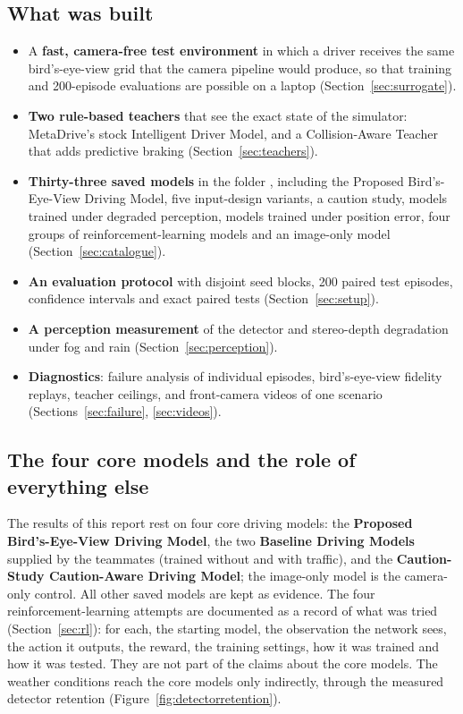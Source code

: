 \subsection{What was built}
\begin{itemize}
\item A \textbf{fast, camera-free test environment} in which a driver receives the same bird's-eye-view grid that the camera pipeline would produce, so that training and 200-episode evaluations are possible on a laptop (Section~\ref{sec:surrogate}).
\item \textbf{Two rule-based teachers} that see the exact state of the simulator: MetaDrive's stock Intelligent Driver Model, and a Collision-Aware Teacher that adds predictive braking (Section~\ref{sec:teachers}).
\item \textbf{Thirty-three saved models} in the folder , including the Proposed Bird's-Eye-View Driving Model, five input-design variants, a caution study, models trained under degraded perception, models trained under position error, four groups of reinforcement-learning models and an image-only model (Section~\ref{sec:catalogue}).
\item \textbf{An evaluation protocol} with disjoint seed blocks, 200 paired test episodes, confidence intervals and exact paired tests (Section~\ref{sec:setup}).
\item \textbf{A perception measurement} of the detector and stereo-depth degradation under fog and rain (Section~\ref{sec:perception}).
\item \textbf{Diagnostics}: failure analysis of individual episodes, bird's-eye-view fidelity replays, teacher ceilings, and front-camera videos of one scenario (Sections~\ref{sec:failure}, \ref{sec:videos}).
\end{itemize}

\subsection{The four core models and the role of everything else}
The results of this report rest on four core driving models: the \textbf{Proposed Bird's-Eye-View Driving Model}, the two \textbf{Baseline Driving Models} supplied by the teammates (trained without and with traffic), and the \textbf{Caution-Study Caution-Aware Driving Model}; the image-only model is the camera-only control. All other saved models are kept as evidence. The four reinforcement-learning attempts are documented as a record of what was tried (Section~\ref{sec:rl}): for each, the starting model, the observation the network sees, the action it outputs, the reward, the training settings, how it was trained and how it was tested. They are not part of the claims about the core models. The weather conditions reach the core models only indirectly, through the measured detector retention (Figure~\ref{fig:detectorretention}).

